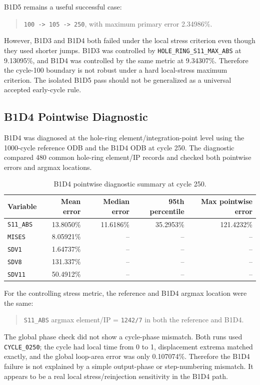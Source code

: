 \documentclass[11pt,a4paper]{article}
\newcommand{\code}[1]{\texttt{#1}}
\begin{document}
B1D5 remains a useful successful case:

\begin{quote}
\code{100 -> 105 -> 250}, with maximum primary error 2.34986\%.
\end{quote}

However, B1D3 and B1D4 both failed under the local stress criterion even though they used shorter jumps. B1D3 was controlled by \code{HOLE\_RING\_S11\_MAX\_ABS} at 9.13095\%, and B1D4 was controlled by the same metric at 9.34307\%. Therefore the cycle-100 boundary is not robust under a hard local-stress maximum criterion. The isolated B1D5 pass should not be generalized as a universal accepted early-cycle rule.

\subsection{B1D4 Pointwise Diagnostic}

B1D4 was diagnosed at the hole-ring element/integration-point level using the 1000-cycle reference ODB and the B1D4 ODB at cycle 250. The diagnostic compared 480 common hole-ring element/IP records and checked both pointwise errors and argmax locations.

\begin{table}[H]
\centering
\caption{B1D4 pointwise diagnostic summary at cycle 250.}
\begin{tabular}{lrrrr}
\toprule
Variable & Mean error & Median error & 95th percentile & Max pointwise error \\
\midrule
\code{S11\_ABS} & 13.8050\% & 11.6186\% & 35.2953\% & 121.4232\% \\
\code{MISES} & 8.05921\% & -- & -- & -- \\
\code{SDV1} & 1.64737\% & -- & -- & -- \\
\code{SDV8} & 131.337\% & -- & -- & -- \\
\code{SDV11} & 50.4912\% & -- & -- & -- \\
\bottomrule
\end{tabular}
\end{table}

For the controlling stress metric, the reference and B1D4 argmax location were the same:

\begin{quote}
\code{S11\_ABS} argmax element/IP = \code{1242/7} in both the reference and B1D4.
\end{quote}

The global phase check did not show a cycle-phase mismatch. Both runs used \code{CYCLE\_0250}; the cycle had local time from 0 to 1, displacement extrema matched exactly, and the global loop-area error was only 0.107074\%. Therefore the B1D4 failure is not explained by a simple output-phase or step-numbering mismatch. It appears to be a real local stress/reinjection sensitivity in the B1D4 path.
\end{document}

